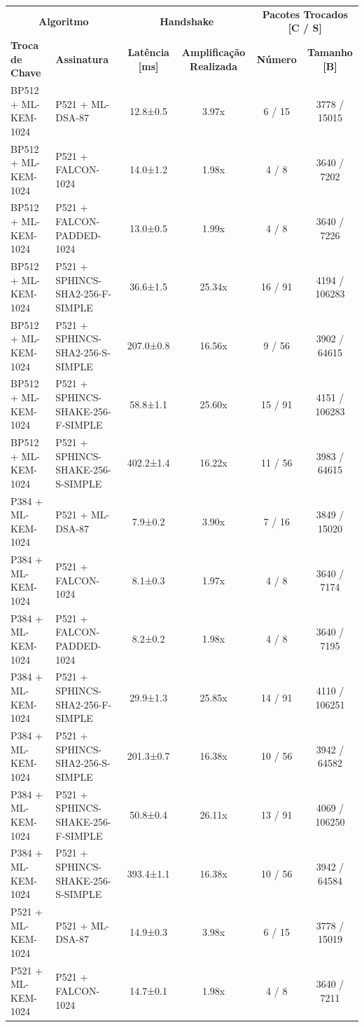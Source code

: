 \documentclass[10pt]{article}
\begin{document}
\centering
\small
\begin{tabular}{@{}l l c c c c@{}}
\toprule
\multicolumn{2}{c}{\textbf{Algoritmo}} & \multicolumn{2}{c}{\textbf{Handshake}} & \multicolumn{2}{c}{\textbf{Pacotes Trocados [C / S]}} \\
\cmidrule(lr){1-2}\cmidrule(lr){3-4}\cmidrule(lr){5-6}
\textbf{Troca de Chave} & \textbf{Assinatura} & \textbf{Latência [ms]} & \textbf{Amplificação Realizada} & \textbf{Número} & \textbf{Tamanho [B]} \\
\midrule
BP512 + ML-KEM-1024 & P521 + ML-DSA-87 & 12.8±0.5 & 3.97x & 6 / 15 & 3778 / 15015 \\
BP512 + ML-KEM-1024 & P521 + FALCON-1024 & 14.0±1.2 & 1.98x & 4 / 8 & 3640 / 7202 \\
BP512 + ML-KEM-1024 & P521 + FALCON-PADDED-1024 & 13.0±0.5 & 1.99x & 4 / 8 & 3640 / 7226 \\
BP512 + ML-KEM-1024 & P521 + SPHINCS-SHA2-256-F-SIMPLE & 36.6±1.5 & 25.34x & 16 / 91 & 4194 / 106283 \\
BP512 + ML-KEM-1024 & P521 + SPHINCS-SHA2-256-S-SIMPLE & 207.0±0.8 & 16.56x & 9 / 56 & 3902 / 64615 \\
BP512 + ML-KEM-1024 & P521 + SPHINCS-SHAKE-256-F-SIMPLE & 58.8±1.1 & 25.60x & 15 / 91 & 4151 / 106283 \\
BP512 + ML-KEM-1024 & P521 + SPHINCS-SHAKE-256-S-SIMPLE & 402.2±1.4 & 16.22x & 11 / 56 & 3983 / 64615 \\
P384 + ML-KEM-1024 & P521 + ML-DSA-87 & 7.9±0.2 & 3.90x & 7 / 16 & 3849 / 15020 \\
P384 + ML-KEM-1024 & P521 + FALCON-1024 & 8.1±0.3 & 1.97x & 4 / 8 & 3640 / 7174 \\
P384 + ML-KEM-1024 & P521 + FALCON-PADDED-1024 & 8.2±0.2 & 1.98x & 4 / 8 & 3640 / 7195 \\
P384 + ML-KEM-1024 & P521 + SPHINCS-SHA2-256-F-SIMPLE & 29.9±1.3 & 25.85x & 14 / 91 & 4110 / 106251 \\
P384 + ML-KEM-1024 & P521 + SPHINCS-SHA2-256-S-SIMPLE & 201.3±0.7 & 16.38x & 10 / 56 & 3942 / 64582 \\
P384 + ML-KEM-1024 & P521 + SPHINCS-SHAKE-256-F-SIMPLE & 50.8±0.4 & 26.11x & 13 / 91 & 4069 / 106250 \\
P384 + ML-KEM-1024 & P521 + SPHINCS-SHAKE-256-S-SIMPLE & 393.4±1.1 & 16.38x & 10 / 56 & 3942 / 64584 \\
P521 + ML-KEM-1024 & P521 + ML-DSA-87 & 14.9±0.3 & 3.98x & 6 / 15 & 3778 / 15019 \\
P521 + ML-KEM-1024 & P521 + FALCON-1024 & 14.7±0.1 & 1.98x & 4 / 8 & 3640 / 7211 \\

\end{tabular}
\end{document}
